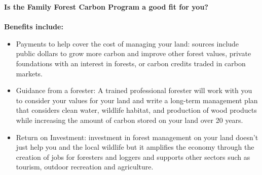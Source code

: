 \documentclass{article}\usepackage[]{graphicx}\usepackage[]{color}
\begin{document}
{\Large{\textbf{Is the Family Forest Carbon Program a good fit for you?}}} \\
\vspace{2ex}\\
{\large{\textbf{Benefits include:}}}
  \begin{itemize}
  \item Payments to help cover the cost of managing your land: sources include public dollars to grow more carbon and improve other forest values, private foundations with an interest in forests, or carbon credits traded in carbon markets.
  \item Guidance from a forester: A trained professional forester will work with you to consider your values for your land and write a long-term management plan that considers clean water, wildlife habitat, and production of wood products while increasing the amount of carbon stored on your land over 20 years.
  \item Return on Investment: investment in forest management on your land doesn't just help you and the local wildlife but it amplifies the economy through the creation of jobs for foresters and loggers and supports other sectors such as tourism, outdoor recreation and agriculture. 
  \end{itemize}
\end{document}
